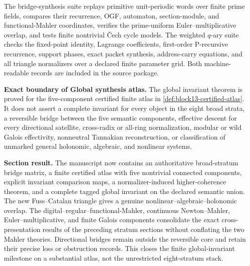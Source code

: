 The bridge-synthesis suite replays primitive unit-periodic words over finite prime fields, compares their recurrence, OGF, automaton, section-module, and functional-Mahler coordinates, verifies the prime-uniform Euler--multiplicative overlap, and tests finite nontrivial \v{C}ech cycle models.  The weighted \(q\)-ary suite checks the fixed-point identity, Lagrange coefficients, first-order P-recursive recurrence, support phases, exact packet synthesis, address-carry equations, and all triangle normalizers over a declared finite parameter grid.  Both machine-readable records are included in the source package.

\begin{boundarybox}
\textbf{Exact boundary of Global synthesis atlas.}
The global invariant theorem is proved for the five-component certified finite atlas in \cref{def:block13-certified-atlas}.  It does not assert a complete invariant for every object in the eight broad strata, a reversible bridge between the five semantic components, effective descent for every directional satellite, cross-radix or all-ring normalization, modular or wild Galois effectivity, nonneutral Tannakian reconstruction, or classification of unmarked general holonomic, algebraic, and nonlinear systems.
\end{boundarybox}

\begin{resultbox}
\textbf{Section result.}
The manuscript now contains an authoritative broad-stratum bridge matrix, a finite certified atlas with five nontrivial connected components, explicit invariant comparison maps, a normalizer-induced higher-coherence theorem, and a complete tagged global invariant on the declared semantic union.  The new Fuss--Catalan triangle gives a genuine nonlinear--algebraic--holonomic overlap.  The digital--regular--functional-Mahler, continuous Newton--Mahler, Euler--multiplicative, and finite Galois components consolidate the exact cross-presentation results of the preceding stratum sections without conflating the two Mahler theories.  Directional bridges remain outside the reversible core and retain their precise loss or obstruction records.  This closes the finite global-invariant milestone on a substantial atlas, not the unrestricted eight-stratum stack.
\end{resultbox}
